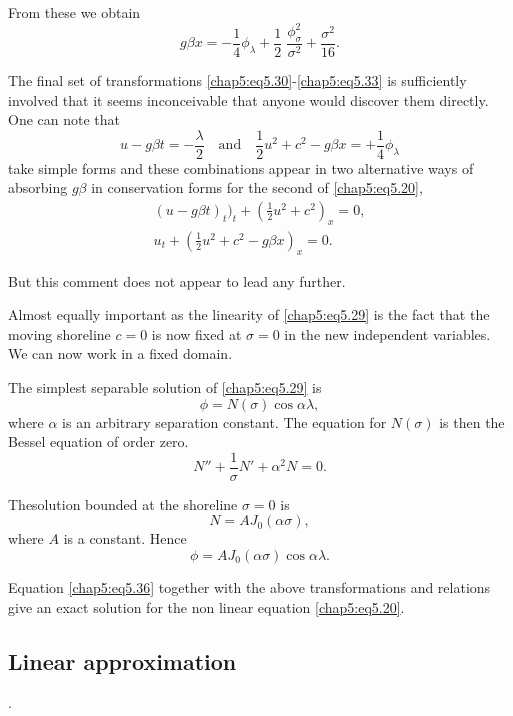 From these we obtain
\begin{equation}
g\beta x= -\frac{1}{4}\phi_\lambda +\frac{1}{2}\;\frac{\phi_\sigma^2}{\sigma^2}+ \frac{\sigma^2}{16}.\tag{5.33}\label{chap5:eq5.33}
\end{equation}

The final set of transformations \eqref{chap5:eq5.30}-\eqref{chap5:eq5.33} is sufficiently involved that it seems inconceivable that anyone would discover them directly. One can note that 
$$
u-g\beta t= -\frac{\lambda}{2}\quad\text{and}\quad\frac{1}{2}u^2+c^2-g\beta x= +\frac{1}{4}\phi_\lambda
$$
take simple forms and these combinations appear in two alternative ways of absorbing $g\beta$ in conservation forms for the second of \eqref{chap5:eq5.20}, \ie
\begin{gather*}
(u-g\beta t)_t)_t+\left(\frac{1}{2}u^2+c^2\right)_x=0,\\
u_t+\left(\frac{1}{2}u^2+c^2-g\beta x\right)_x=0.
\end{gather*}

But this comment does not appear to lead any further.

Almost equally important as the linearity of \eqref{chap5:eq5.29} is the fact that the moving shoreline $c=0$ is now fixed at $\sigma =0$ in the new independent variables. We can now work in a fixed domain.

The simplest separable solution of \eqref{chap5:eq5.29} is 
\begin{equation}
\phi =N(\sigma)\cos \alpha\lambda,\tag{5.34}\label{chap5:eq5.34}
\end{equation}
where $\alpha$ is an arbitrary separation constant. The equation for $N(\sigma)$ is then the Bessel equation of order zero.
\begin{equation}
N''+\frac{1}{\sigma}N'+\alpha^2N=0.\tag{5.35}\label{chap5:eq5.35}
\end{equation}

The\pageoriginale solution bounded at the shoreline $\sigma =0$ is 
$$
N=AJ_0(\alpha\sigma),
$$
where $A$ is a constant. Hence
\begin{equation}
\phi =AJ_0(\alpha\sigma)\cos\alpha\lambda.\tag{5.36}\label{chap5:eq5.36}
\end{equation}

Equation \eqref{chap5:eq5.36} together with the above transformations and relations give an exact solution for the non linear equation \eqref{chap5:eq5.20}. 

\subsection*{\bf Linear approximation}.

